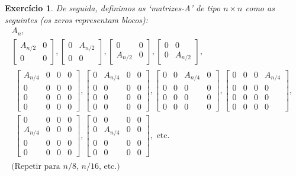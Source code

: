\documentclass{article}
\newtheorem{ex}{Exercício}
\begin{document}
\begin{ex}
De seguida, definimos as `matrizes-A' de tipo $n \times n$ como as seguintes (os zeros representam blocos):
\begin{gather*}
A_n,\\
\begin{bmatrix}
A_{n/2} & 0\\
0 & 0
\end{bmatrix},
\begin{bmatrix}
0 & A_{n/2}\\
0 & 0
\end{bmatrix},
\begin{bmatrix}
0 & 0\\
A_{n/2} & 0
\end{bmatrix},
\begin{bmatrix}
0 & 0\\
0 & A_{n/2}
\end{bmatrix},\\
\begin{multlined}
\begin{bmatrix}
A_{n/4} & 0 & 0 & 0\\
0 & 0 & 0 & 0\\
0 & 0 & 0 & 0\\
0 & 0 & 0 & 0
\end{bmatrix},
\begin{bmatrix}
0 & A_{n/4} & 0 & 0\\
0 & 0 & 0 & 0\\
0 & 0 & 0 & 0\\
0 & 0 & 0 & 0
\end{bmatrix},
\begin{bmatrix}
0 & 0 & A_{n/4} & 0\\
0 & 0 & 0 & 0\\
0 & 0 & 0 & 0\\
0 & 0 & 0 & 0
\end{bmatrix},
\begin{bmatrix}
0 & 0 & 0 & A_{n/4}\\
0 & 0 & 0 & 0\\
0 & 0 & 0 & 0\\
0 & 0 & 0 & 0
\end{bmatrix},\\
\begin{bmatrix}
0 & 0 & 0 & 0\\
A_{n/4} & 0 & 0 & 0\\
0 & 0 & 0 & 0\\
0 & 0 & 0 & 0
\end{bmatrix},
\begin{bmatrix}
0 & 0 & 0 & 0\\
0 & A_{n/4} & 0 & 0\\
0 & 0 & 0 & 0\\
0 & 0 & 0 & 0
\end{bmatrix}, \text{ etc.}
\end{multlined}\\
\text{(Repetir para $n/8$, $n/16$, etc.)}
\end{gather*}


\end{ex}
\end{document}
